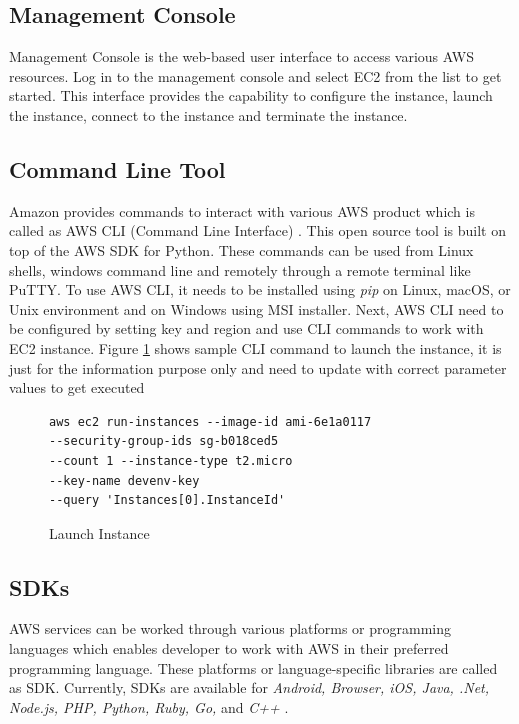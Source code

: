 \subsection{Management Console}
Management Console \cite{www-aws-ec2-gettingStarted} is the web-based user interface to access various AWS resources. Log in to the management console and select EC2 from the list to get started. This interface provides the capability to configure the instance, launch the instance, connect to the instance and terminate the instance.

\subsection{Command Line Tool}
Amazon provides commands to interact with various AWS product which is called as AWS CLI (Command Line Interface) \cite{www-aws-ec2-cli}. This open source tool is built on top of the AWS SDK for Python. These commands can be used from Linux shells, windows command line and remotely through a remote terminal like PuTTY. To use AWS CLI, it needs to be installed using \emph{pip} on Linux, macOS, or Unix environment and on Windows using MSI installer. Next, AWS CLI need to be configured by setting key and region and use CLI commands to work with EC2 instance.
Figure \ref{c:cli-launch} shows sample CLI command to launch the instance, it is just for the information purpose only and need to update with correct parameter values to get executed
\begin{figure}[htb]
\begin{verbatim}
aws ec2 run-instances --image-id ami-6e1a0117
--security-group-ids sg-b018ced5 
--count 1 --instance-type t2.micro 
--key-name devenv-key 
--query 'Instances[0].InstanceId'
\end{verbatim}
\caption{Launch Instance \cite{www-aws-ec2-cli}}\label{c:cli-launch}
\end{figure}

\subsection{SDKs}
AWS services can be worked through various platforms or programming languages which enables developer to work with AWS in their preferred programming language. These platforms or language-specific libraries are called as SDK. Currently, SDKs are available for \emph{Android, Browser, iOS, Java, .Net, Node.js, PHP, Python, Ruby, Go,} and \emph{C++} \cite{www-aws-ec2-sdk}. 

